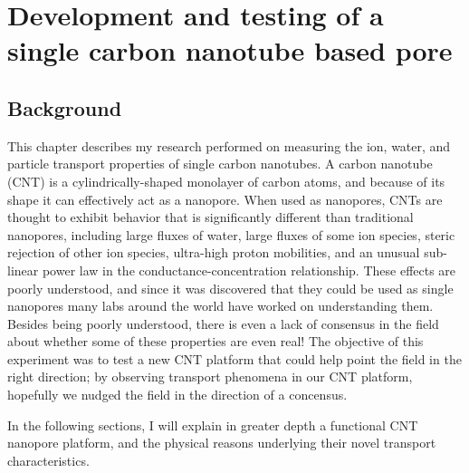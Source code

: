 \graphicspath{{../images/ch2/}}	%


\chapter{Development and testing of a single carbon nanotube based pore}

	

	\section{Background}
	
		This chapter describes my research performed on measuring the ion, water, and particle transport properties of single carbon nanotubes. A carbon nanotube (CNT) is a cylindrically-shaped monolayer of carbon atoms, and because of its shape it can effectively act as a nanopore.  When used as nanopores, CNTs are thought to exhibit behavior that is significantly different than traditional nanopores, including large fluxes of water, large fluxes of some ion species, steric rejection of other ion species, ultra-high proton mobilities, and an unusual sub-linear power law in the conductance-concentration relationship. These effects are poorly understood, and since it was discovered that they could be used as single nanopores many labs around the world have worked on understanding them. Besides being poorly understood, there is even a lack of consensus in the field about whether some of these properties are even real! The objective of this experiment was to test a new CNT platform that could help point the field in the right direction; by observing transport phenomena in our CNT platform, hopefully we nudged the field in the direction of a concensus. 
		
		In the following sections, I will explain in greater depth a functional CNT nanopore platform, and the physical reasons underlying their novel transport characteristics.
		
		
		
	

	




